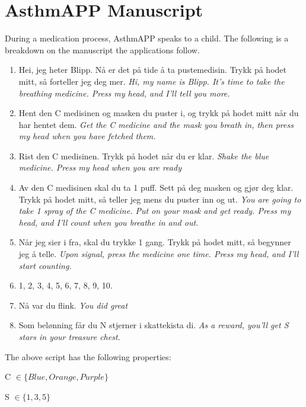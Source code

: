 \chapter{AsthmAPP Manuscript}
\label{chp:anuscript} %
During a medication process, AsthmAPP speaks to a child. The following is a breakdown on the manuscript the applications follow.
\begin{enumerate}
  \item Hei, jeg heter Blipp. N\r{a} er det p\r{a} tide \r{a} ta pustemedisin. Trykk p\r{a} hodet mitt, s\r{a} forteller jeg deg mer. \emph{Hi, my name is Blipp. It's time to take the breathing medicine. Press my head, and I'll tell you more.}
  \item Hent den C medisinen og masken du puster i, og trykk p\r{a} hodet mitt n\r{a}r du har hentet dem. \emph{Get the C medicine and the mask you breath in, then press my head when you have fetched them.}
  \item Rist den C medisinen. Trykk p\r{a} hodet n\r{a}r du er klar. \emph{Shake the blue medicine. Press my head when you are ready}
  \item Av den C medisinen skal du ta 1 puff. Sett p\r{a} deg masken og gj\o r deg klar. Trykk p\r{a} hodet mitt, s\r{a} teller jeg mens du puster inn og ut. \emph{You are going to take 1 spray of the C medicine. Put on your mask and get ready. Press my head, and I'll count when you breathe in and out.} 
  \item N\r{a}r jeg sier i fra, skal du trykke 1 gang. Trykk p\r{a} hodet mitt, s\r{a} begynner jeg \r{a} telle. \emph{Upon signal, press the medicine one time. Press my head, and I'll start counting. }
  \item 1, 2, 3, 4, 5, 6, 7, 8, 9, 10.
  \item N\r{a} var du flink. \emph{You did great}
  \item Som bel\o nning f\r{a}r du N stjerner i skattekista di. \emph{As a reward, you'll get S stars in your treasure chest.}
\end{enumerate}

The above script has the following properties:

C $\in \{ Blue, Orange, Purple \}$


S $\in \{ 1, 3, 5 \}$ 